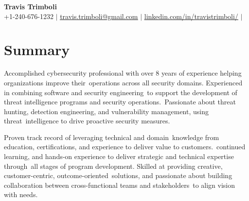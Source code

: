 \documentclass[letterpaper,11pt]{article}
\begin{document}

\begin{center}
  \textbf{\Huge \bfseries Travis Trimboli} \\ \vspace{5pt}
  \small +1-240-676-1232 $|$ \href{mailto:travis.trimboli@gmail.com}{\underline{travis.trimboli@gmail.com}} $|$
  \href{https://www.linkedin.com/in/travistrimboli/}{\underline{linkedin.com/in/travistrimboli/}} $|$
\end{center}

\section*{Summary}
Accomplished cybersecurity professional with over 8 years of experience helping organizations improve their\
operations across all security domains. Experienced in combining software and security engineering\
to support the development of threat intelligence programs and security operations.\
Passionate about threat hunting, detection engineering, and vulnerability management, using threat\
intelligence to drive proactive security measures.

Proven track record of leveraging technical and domain\
knowledge from education, certifications, and experience to deliver value to customers.\
continued learning, and hands-on experience to deliver strategic and technical expertise through\
all stages of program development. Skilled at providing creative, customer-centric, outcome-oriented\ 
solutions, and passionate about building collaboration between cross-functional teams and stakeholders\ 
to align vision with needs.

\end{document}

